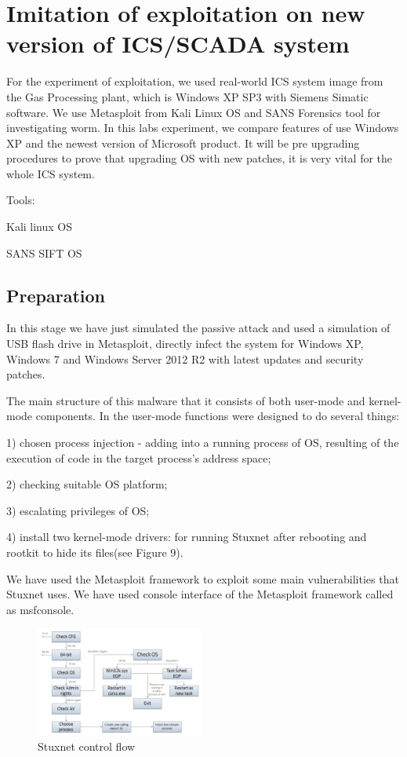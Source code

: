 \documentclass[conference]{IEEEtran}
\begin{document}
\section{Imitation  of  exploitation  on  new  version  of ICS/SCADA system}
\label{sec:APP}
For the experiment of exploitation, we used real-world ICS system image from the Gas Processing plant, which is Windows XP SP3 with Siemens Simatic software. We use Metasploit from Kali Linux OS and SANS Forensics tool for investigating worm. In this labs experiment, we compare features of use Windows XP and the newest version of Microsoft product. It will be pre upgrading procedures to prove that upgrading OS with new patches, it is very vital for the whole ICS system.

    Tools:

     Kali linux OS

     SANS SIFT OS

\subsection{Preparation}
In this stage we have just simulated the passive attack and used a simulation of USB flash drive in Metasploit, directly infect the system for Windows XP, Windows 7 and Windows Server 2012 R2 with latest updates and security patches.  

The main structure of this malware that it consists of both user-mode and kernel-mode components. In the user-mode functions were designed to do several things: 

1) chosen process injection - adding into a running process of OS, resulting of the execution of code in the target process’s address space;

2) checking suitable OS platform; 

3) escalating privileges of OS; 

4) install two kernel-mode drivers: for running Stuxnet after rebooting and rootkit to hide its files(see Figure 9). 

We have used the Metasploit framework to exploit some main vulnerabilities that Stuxnet uses. We have used console interface of the Metasploit framework called as msfconsole.
\begin{figure}[!htb]
	\includegraphics[width=0.49\textwidth]{images/process.png}
	\caption{ Stuxnet control flow %
	}
	\label{fig:fb}
\end{figure}
\end{document}

